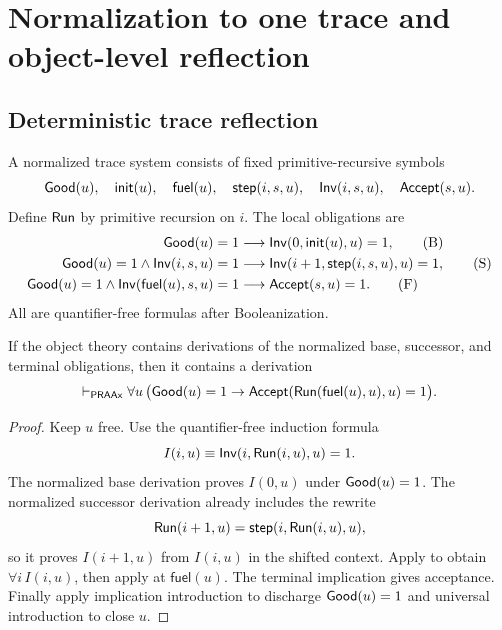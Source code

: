 \section{Normalization to one trace and object-level reflection}\label{sec:compiler}

\subsection{Deterministic trace reflection}

A normalized trace system consists of fixed primitive-recursive symbols
\[
  \mathsf{Good}(u),\quad \mathsf{init}(u),\quad \mathsf{fuel}(u),\quad
  \mathsf{step}(i,s,u),\quad \mathsf{Inv}(i,s,u),\quad \mathsf{Accept}(s,u).
\]
Define \(\mathsf{Run}\) by primitive recursion on \(i\).  The local obligations are
\begin{align}
 \mathsf{Good}(u)=1 &\longrightarrow \mathsf{Inv}(0,\mathsf{init}(u),u)=1, \tag{B}\label{eq:base}\\
 \mathsf{Good}(u)=1\wedge \mathsf{Inv}(i,s,u)=1
   &\longrightarrow \mathsf{Inv}(i+1,\mathsf{step}(i,s,u),u)=1, \tag{S}\label{eq:step}\\
 \mathsf{Good}(u)=1\wedge \mathsf{Inv}(\mathsf{fuel}(u),s,u)=1
   &\longrightarrow \mathsf{Accept}(s,u)=1. \tag{F}\label{eq:finish}
\end{align}
All are quantifier-free formulas after Booleanization.

\begin{theorem}\label{thm:trace-reflection}
If the object theory contains derivations of the normalized base, successor, and terminal obligations, then it contains a derivation
\[
  \vdash_{\mathsf{PRAAx}}\forall u\,
  \bigl(\mathsf{Good}(u)=1\to
    \mathsf{Accept}(\mathsf{Run}(\mathsf{fuel}(u),u),u)=1\bigr).
\]
\end{theorem}

\begin{proof}
Keep \(u\) free.  Use the quantifier-free induction formula
\[
 I(i,u)\equiv \mathsf{Inv}(i,\mathsf{Run}(i,u),u)=1.
\]
The normalized base derivation proves \(I(0,u)\) under \(\mathsf{Good}(u)=1\).  The normalized successor derivation already includes the rewrite
\[
 \mathsf{Run}(i+1,u)=\mathsf{step}(i,\mathsf{Run}(i,u),u),
\]
so it proves \(I(i+1,u)\) from \(I(i,u)\) in the shifted context.  Apply  to obtain \(\forall i\,I(i,u)\), then apply  at \(\mathsf{fuel}(u)\).  The terminal implication gives acceptance.  Finally apply implication introduction to discharge \(\mathsf{Good}(u)=1\) and universal introduction to close \(u\).
\end{proof}

